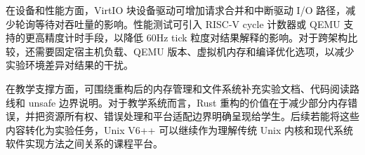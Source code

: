 在设备和性能方面，VirtIO 块设备驱动可增加请求合并和中断驱动 I/O 路径，减少轮询等待对吞吐量的影响。性能测试可引入 RISC-V cycle 计数器或 QEMU 支持的更高精度计时手段，以降低 60Hz tick 粒度对结果解释的影响。对于跨架构比较，还需要固定宿主机负载、QEMU 版本、虚拟机内存和编译优化选项，以减少实验环境差异对结果的干扰。

在教学支撑方面，可围绕重构后的内存管理和文件系统补充实验文档、代码阅读路线和 unsafe 边界说明。对于教学系统而言，Rust 重构的价值在于减少部分内存错误，并把资源所有权、错误处理和平台适配边界明确呈现给学生。后续若能将这些内容转化为实验任务，Unix V6++ 可以继续作为理解传统 Unix 内核和现代系统软件实现方法之间关系的课程平台。
